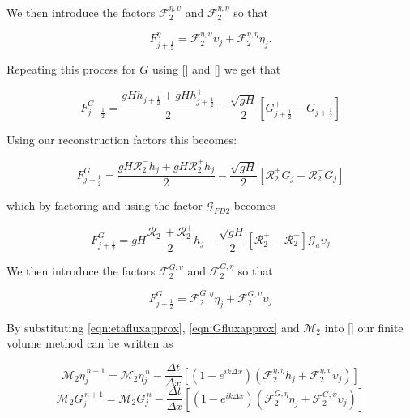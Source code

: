 \documentclass[12pt]{article}
\begin{document}
We then introduce the factors $\mathcal{F}_2^{\eta,\upsilon}$ and $\mathcal{F}_2^{\eta,\eta}$ so that 

\begin{equation}
\label{eqn:etafluxapprox}
F^{\eta}_{j+\frac{1}{2}} = \mathcal{F}_2^{\eta,\upsilon} \upsilon_{j}   +  \mathcal{F}_2^{\eta,\eta} {\eta}_j.
\end{equation}

Repeating this process for $G$ using [] and [] we get that

\begin{equation}
\label{eqn:HLL_fluxG}
F^{G}_{j+\frac{1}{2}} = \dfrac{ gHh^-_{j+\frac{1}{2}} + gHh^+_{j+\frac{1}{2}}}{ 2}  - \dfrac{ \sqrt{gH}}{ 2} \left [ G^+_{j+\frac{1}{2}} - G^-_{j+\frac{1}{2}} \right ]
\end{equation}

Using our reconstruction factors this becomes:

\begin{equation*}
F^{G}_{j+\frac{1}{2}} = \dfrac{ gH \mathcal{R}^-_2h_{j} + gH \mathcal{R}^+_2 h_{j}}{ 2}  - \dfrac{ \sqrt{gH}}{ 2} \left [  \mathcal{R}^+_2 G_{j} -  \mathcal{R}^-_2G_{j} \right ]
\end{equation*}

which by factoring and using the factor $\mathcal{G}_{FD2}$ becomes

\begin{equation*}
F^{G}_{j+\frac{1}{2}} =  gH \dfrac{\mathcal{R}^-_2 + \mathcal{R}^+_2 }{ 2} h_{j}  - \dfrac{ \sqrt{gH}}{ 2} \left [  \mathcal{R}^+_2 -  \mathcal{R}^-_2 \right ] \mathcal{G}_{a}\upsilon_j
\end{equation*}

We then introduce the factors $\mathcal{F}_2^{G,\upsilon}$ and $\mathcal{F}_2^{G,\eta}$ so that 

\begin{equation}
\label{eqn:Gfluxapprox}
F^{G}_{j+\frac{1}{2}} =  \mathcal{F}_2^{G,\eta} \eta_{j}  + \mathcal{F}_2^{G,\upsilon} \upsilon_j
\end{equation}

By substituting \eqref{eqn:etafluxapprox}, \eqref{eqn:Gfluxapprox} and $\mathcal{M}_2$ into [] our finite volume method can be written as


\begin{equation*}
\mathcal{M}_2 \eta^{\,n + 1}_{j} = \mathcal{M}_2 \eta^{\,n }_{j} - \frac{\Delta t}{\Delta x}  \left[ \left(1 - e^{ik\Delta x}\right) \left(\mathcal{F}_2^{\eta,\eta} h_{j}  + \mathcal{F}_2^{\eta,\upsilon} \upsilon_j \right) \right]
\end{equation*}
\begin{equation*}
\mathcal{M}_2 G^{\,n + 1}_{j} = \mathcal{M}_2 G^{\,n }_{j} - \frac{\Delta t}{\Delta x}  \left[ \left(1 - e^{ik\Delta x}\right) \left(  \mathcal{F}_2^{G,\eta} \eta_{j}  + \mathcal{F}_2^{G,\upsilon} \upsilon_j \right) \right]
\end{equation*}
\end{document}
